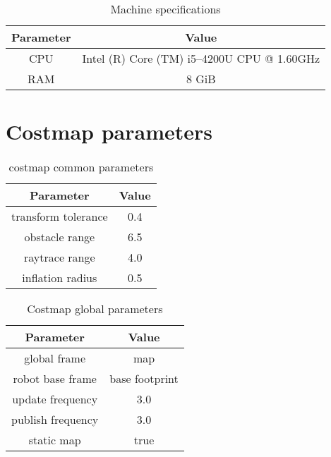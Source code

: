 \begin{table}[H]
    \centering
    \begin{tabular}{cc}
    \textbf{Parameter} & \textbf{Value} \\\toprule
    CPU & Intel (R) Core (TM) i5--4200U CPU @ 1.60GHz \\
    RAM & 8 GiB \\
    \end{tabular}
    \caption{Machine specifications}\label{tab:machine_specifications}
\end{table}

\section{Costmap parameters}%
\label{sec:costmap_parameters}

\begin{table}[H]
    \centering
    \begin{tabular}{cc}
    \textbf{Parameter} & \textbf{Value} \\\toprule
    transform tolerance & 0.4\\
    obstacle range & 6.5\\
    raytrace range & 4.0\\
    inflation radius & 0.5\\
    \end{tabular}
    \caption{costmap common parameters}\label{tab:costmap_common}
\end{table}


\begin{table}[H]
    \centering
    \begin{tabular}{cc}
    \textbf{Parameter} & \textbf{Value} \\\toprule
    global frame & map\\
    robot base frame & base footprint\\
    update frequency & 3.0\\
    publish frequency & 3.0\\
    static map & true\\
    \end{tabular}
    \caption{Costmap global parameters}\label{tab:costmap_global}
\end{table}

